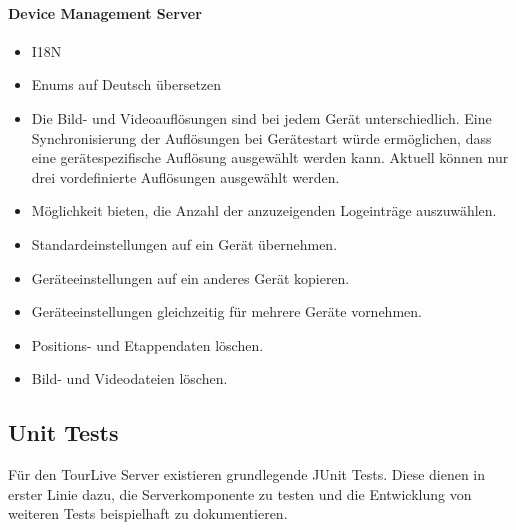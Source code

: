 \paragraph{Device Management Server}
\begin{itemize}
	\item I18N
	\item Enums auf Deutsch übersetzen
	\item Die Bild- und Videoauflösungen sind bei jedem Gerät unterschiedlich. Eine Synchronisierung der Auflösungen bei Gerätestart würde ermöglichen, dass eine gerätespezifische Auflösung ausgewählt werden kann. Aktuell können nur drei vordefinierte Auflösungen ausgewählt werden.
	\item Möglichkeit bieten, die Anzahl der anzuzeigenden Logeinträge auszuwählen.
	\item Standardeinstellungen auf ein Gerät übernehmen.
	\item Geräteeinstellungen auf ein anderes Gerät kopieren. 
	\item Geräteeinstellungen gleichzeitig für mehrere Geräte vornehmen.
	\item Positions- und Etappendaten löschen.
	\item Bild- und Videodateien löschen.
\end{itemize}

\subsection{Unit Tests}
\label{sec:unittests}
Für den TourLive Server existieren grundlegende JUnit Tests. Diese dienen in erster Linie dazu, die Serverkomponente zu testen und die Entwicklung von weiteren Tests beispielhaft zu dokumentieren.